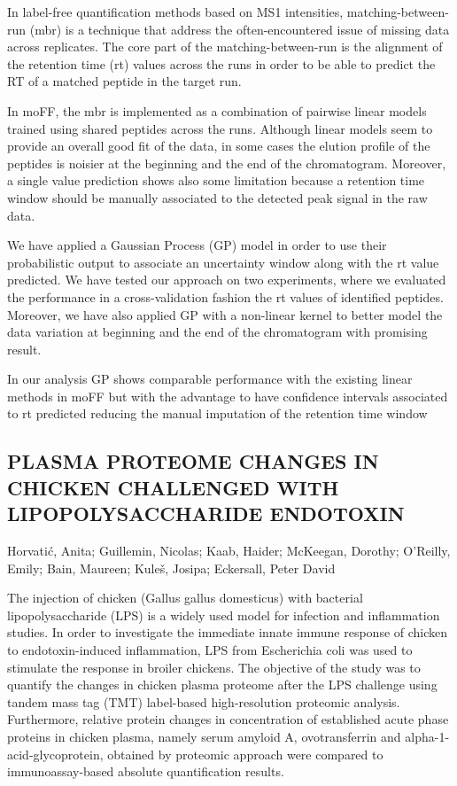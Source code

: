 {In label-free quantification methods based on MS1 intensities, matching-between-run (mbr) is a technique that address the often-encountered issue of missing data across replicates. The core part of the matching-between-run is the alignment of the retention time (rt) values across the runs in order to be able to predict the RT of a matched peptide in the target run.

In moFF, the mbr is implemented as a combination of pairwise linear models trained using shared peptides across the runs. Although linear models seem to provide an overall good fit of the data, in some cases the elution profile of the peptides is noisier at the beginning and the end of the chromatogram. Moreover, a single value prediction shows also some limitation because a retention time window should be manually associated to the detected peak signal in the raw data.

We have applied a Gaussian Process (GP) model in order to use their probabilistic output to associate an uncertainty window along with the rt value predicted. We have tested our approach on two experiments, where we evaluated the performance in a cross-validation fashion the rt values of identified peptides. Moreover, we have also applied GP with a non-linear kernel to better model the data variation at beginning and the end of the chromatogram with promising result.

In our analysis GP shows comparable performance with the existing linear methods in moFF but with the advantage to have confidence intervals associated to rt predicted reducing the manual imputation of the retention time window


\subsection*{\color{eubicRed} PLASMA PROTEOME CHANGES IN CHICKEN CHALLENGED WITH LIPOPOLYSACCHARIDE ENDOTOXIN}
{\color{eubicGray}Horvatić, Anita;
Guillemin, Nicolas;
Kaab, Haider;
McKeegan, Dorothy;
O'Reilly, Emily;
Bain, Maureen;
Kuleš, Josipa;
Eckersall, Peter David}

The injection of chicken (Gallus gallus domesticus) with bacterial lipopolysaccharide (LPS) is a widely used model for infection and inflammation studies. In order to investigate the immediate innate immune response of chicken to endotoxin-induced inflammation, LPS from Escherichia coli was used to stimulate the response in broiler chickens. The objective of the study was to quantify the changes in chicken plasma proteome after the LPS challenge using tandem mass tag (TMT) label-based high-resolution proteomic analysis. Furthermore, relative protein changes in concentration of established acute phase proteins in chicken plasma, namely serum amyloid A, ovotransferrin and alpha-1-acid-glycoprotein, obtained by proteomic approach were compared to immunoassay-based absolute quantification results.

}
